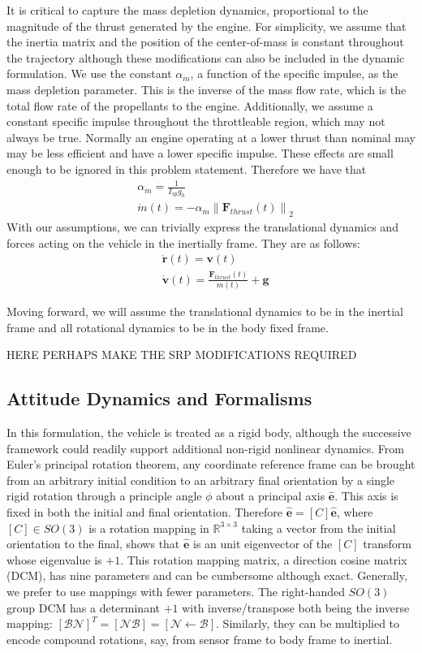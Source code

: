 It is critical to capture the mass depletion dynamics, proportional to the magnitude of the thrust generated by the engine. For simplicity, we assume that the inertia matrix and the position of the center-of-mass is constant throughout the trajectory although these modifications can also be included in the dynamic formulation. We use the constant $\alpha_{\dot{m}}$, a function of the specific impulse, as the mass depletion parameter. This is the inverse of the mass flow rate, which is the total flow rate of the propellants to the engine. Additionally, we assume a constant specific impulse throughout the throttleable region, which may not always be true. Normally an engine operating at a lower thrust than nominal may may be less efficient and have a lower specific impulse. These effects are small enough to be ignored in this problem statement. Therefore we have that
% 
\begin{align}
& \alpha_{\dot{m}} = \frac{1}{I_{sp} g_0} \\
& \dot{m}(t) = -\alpha_{\dot{m}} \left\lVert \mathbf{F}_{thrust}(t) \right\rVert _2
\end{align}
% 
With our assumptions, we can trivially express the translational dynamics and forces acting on the vehicle in the inertially frame. They are as follows:
% 
\begin{align}
& \dot{\mathbf{r}}(t) = \mathbf{v}(t) \\
& \dot{\mathbf{v}}(t) = \frac{\mathbf{F}_{thrust}(t)}{m(t)} + \mathbf{g}
\end{align}
%

Moving forward, we will assume the translational dynamics to be in the inertial frame and all rotational dynamics to be in the body fixed frame.

HERE PERHAPS MAKE THE SRP MODIFICATIONS REQUIRED

\subsection{Attitude Dynamics and Formalisms}
In this formulation, the vehicle is treated as a rigid body, although the successive framework could readily support additional non-rigid nonlinear dynamics. From Euler's principal rotation theorem,  any coordinate reference frame can be brought from an arbitrary initial condition to an arbitrary final orientation by a single rigid rotation through a principle angle $\phi$ about a principal axis $\hat{\bm{e}}$. This axis is fixed in both the initial and final orientation. Therefore $\hat{\bm{e}} = [C]\hat{\bm{e}}$, where $[C]\in SO(3)$ is a rotation mapping in $\mathbb{R}^{3\times3}$ taking a vector from the initial orientation to the final, shows that $\hat{\bm{e}}$ is an unit eigenvector of the $[C]$ transform whose eigenvalue is $+1$. This rotation mapping matrix, a direction cosine matrix (DCM), has nine parameters and can be cumbersome although exact. Generally, we prefer to use mappings with fewer parameters. The right-handed $SO(3)$ group DCM has a determinant $+1$ with inverse/transpose both being the inverse mapping: $[\mathcal{B}\mathcal{N}]^T = [\mathcal{N}\mathcal{B}] = [\mathcal{N} \leftarrow \mathcal{B}]$. Similarly, they can be multiplied to encode compound rotations, say, from sensor frame to body frame to inertial.


